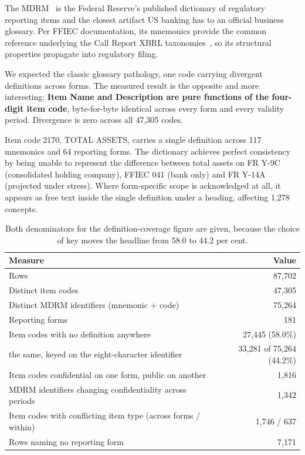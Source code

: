 \documentclass[11pt]{article}
\begin{document}
The MDRM~\cite{mdrm} is the Federal Reserve's published dictionary of regulatory reporting items and the closest artifact US banking has to an official business glossary. Per FFIEC documentation, its mnemonics provide the common reference underlying the Call Report XBRL taxonomies~\cite{cdr}, so its structural properties propagate into regulatory filing.

We expected the classic glossary pathology, one code carrying divergent definitions across forms. The measured result is the opposite and more interesting: \textbf{Item Name and Description are pure functions of the four-digit item code}, byte-for-byte identical across every form and every validity period. Divergence is zero across all 47,305 codes.

Item code 2170, TOTAL ASSETS, carries a single definition across 117 mnemonics and 64 reporting forms. The dictionary achieves perfect consistency by being unable to represent the difference between total assets on FR Y-9C (consolidated holding company), FFIEC 041 (bank only) and FR Y-14A (projected under stress). Where form-specific scope is acknowledged at all, it appears as free text inside the single definition under a  heading, affecting 1,278 concepts.

\begin{table}[h]
\centering
\small
\begin{tabularx}{\textwidth}{@{}Xr@{}}
\toprule
Measure & Value \\
\midrule
Rows & 87,702 \\
Distinct item codes & 47,305 \\
Distinct MDRM identifiers (mnemonic + code) & 75,264 \\
Reporting forms & 181 \\
Item codes with no definition anywhere & 27,445 (58.0\%) \\
\quad the same, keyed on the eight-character identifier & 33,281 of 75,264 (44.2\%) \\
Item codes confidential on one form, public on another & 1,816 \\
MDRM identifiers changing confidentiality across periods & 1,342 \\
Item codes with conflicting item type (across forms / within) & 1,746 / 637 \\
Rows naming no reporting form & 7,171 \\
\bottomrule
\end{tabularx}
\caption{Both denominators for the definition-coverage figure are given, because the choice of key moves the headline from 58.0 to 44.2 per cent.}
\label{tab:mdrm}
\end{table}
\end{document}
